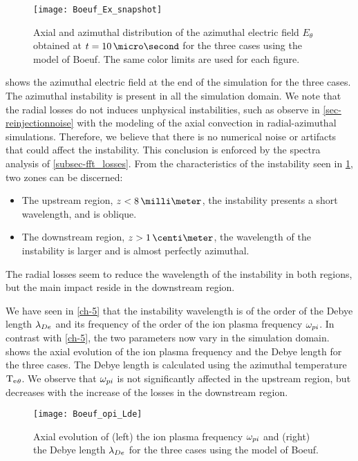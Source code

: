   \begin{figure}[hbt]
    \centering
    \texttt{[image: Boeuf\_Ex\_snapshot]}
    \caption{Axial and azimuthal distribution of the azimuthal electric field $E_{\theta}$  obtained at $t=10 \,\micro\second$ for the three cases using the model of Boeuf. The same color limits are used for each figure.}
    \label{fig-snapshots}
  \end{figure}

   shows the azimuthal electric field at the end of the simulation for the three cases.
  The azimuthal instability is present in all the simulation domain.
  We note that the radial losses do not induces unphysical instabilities, such as observe in \cref{sec-reinjectionnoise} with the modeling of the axial convection in radial-azimuthal simulations.
  Therefore, we believe that there is no numerical noise or artifacts that could affect the instability.
  This conclusion is enforced by the spectra analysis of \cref{subsec-fft_losses}.
  From the characteristics of the instability seen in \cref{fig-snapshots}, two zones can be discerned\string:
  \begin{itemize}
    \item The upstream region, $z < 8 \,\milli\meter$, the instability presents a short wavelength, and is oblique.
    \item The downstream region, $z > 1\,\centi\meter$, the wavelength of the instability is larger and is almost perfectly azimuthal.
  \end{itemize}
  The radial losses seem to reduce the wavelength of the instability in both regions, but the main impact reside in the downstream region.


  We have seen in \cref{ch-5} that the instability wavelength is of the order of the Debye length $\lambda_{De}$ and its frequency of the order of the ion plasma frequency $\omega_{pi}$.
  In contrast with \cref{ch-5}, the two parameters now vary in the simulation domain.
   shows the axial evolution of the ion plasma frequency and the Debye length for the three cases.
  The Debye length is calculated using the azimuthal temperature $\mathrm{T_e}_{\theta}$.
  We observe that $\omega_{pi}$ is not significantly affected in the upstream region, but decreases with the increase of the losses in the downstream region.

  \begin{figure}[hbt]
    \centering
    \texttt{[image: Boeuf\_opi\_Lde]}
    \caption{Axial evolution of (left) the ion plasma frequency $\omega_{pi}$ and (right) the Debye length $\lambda_{De}$ for the three cases using the model of Boeuf.}
    \label{fig-wpi_Lde}
  \end{figure}


